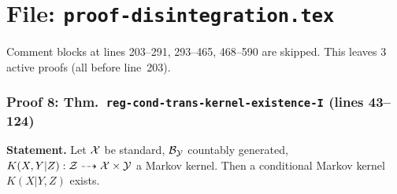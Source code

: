 \documentclass{article}
\begin{document}
\part*{File: \texttt{proof-disintegration.tex}}

Comment blocks at lines 203--291, 293--465, 468--590 are skipped.
This leaves 3 active proofs (all before line~203).

\section{Proof 8: Thm.\ \texttt{reg-cond-trans-kernel-existence-I} (lines 43--124)}

\textbf{Statement.} Let $\mathcal{X}$ be standard, $\mathcal{B}_{\mathcal{Y}}$ countably generated,
$K(X,Y|Z): \mathcal{Z} \dashrightarrow \mathcal{X}\times\mathcal{Y}$ a Markov kernel.
Then a conditional Markov kernel $K(X|Y,Z)$ exists.
\end{document}

